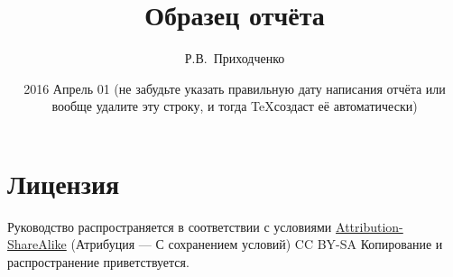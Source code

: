 
\author{Р.В.~Приходченко}

\title{Образец отчёта}

\date{2016 Апрель 01 (не забудьте указать правильную дату написания
  отчёта или вообще удалите эту строку, и тогда \TeX создаст её
  автоматически)}

\frenchspacing


\makeindex



\renewcommand\bibname{СПИСОК ЛИТЕРАТУРЫ} 
\renewcommand\refname{\centering Список литературы}
\renewcommand\contentsname{\centering Содержание}



\maketitle

\tableofcontents







\section{Лицензия}



Руководство распространяется в соответствии с
    условиями \href{http://creativecommons.org/licenses/by-sa/3.0/}{Attribution-ShareAlike} 
    (Атрибуция — С сохранением условий) CC BY-SA %
    Копирование и распространение приветствуется.



